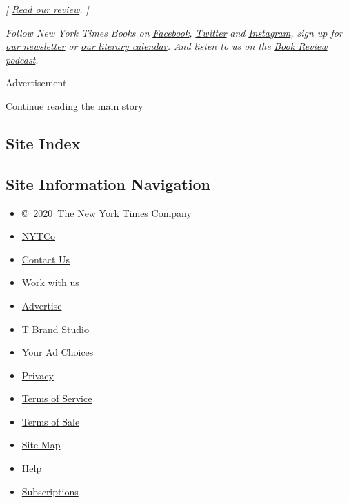 \emph{{[}}
\href{https://www.nytimes.com/2020/07/07/books/review/want-lynn-steger-strong.html}{\emph{Read
our review}}\emph{. {]}}

\emph{Follow New York Times Books on}
\href{https://www.facebook.com/nytbooks/}{\emph{Facebook}}\emph{,}
\href{https://twitter.com/nytimesbooks}{\emph{Twitter}} \emph{and}
\href{https://www.instagram.com/nytbooks/}{\emph{Instagram}}\emph{, sign
up for}
\href{https://www.nytimes.com/newsletters/books-review}{\emph{our
newsletter}} \emph{or}
\href{https://www.nytimes.com/interactive/2017/books/books-calendar.html}{\emph{our
literary calendar}}\emph{. And listen to us on the}
\href{https://www.nytimes.com/column/book-review-podcast}{\emph{Book
Review podcast}}\emph{.}

Advertisement

\protect\hyperlink{after-bottom}{Continue reading the main story}

\hypertarget{site-index}{%
\subsection{Site Index}\label{site-index}}

\hypertarget{site-information-navigation}{%
\subsection{Site Information
Navigation}\label{site-information-navigation}}

\begin{itemize}
\tightlist
\item
  \href{https://help.nytimes.com/hc/en-us/articles/115014792127-Copyright-notice}{©~2020~The
  New York Times Company}
\end{itemize}

\begin{itemize}
\tightlist
\item
  \href{https://www.nytco.com/}{NYTCo}
\item
  \href{https://help.nytimes.com/hc/en-us/articles/115015385887-Contact-Us}{Contact
  Us}
\item
  \href{https://www.nytco.com/careers/}{Work with us}
\item
  \href{https://nytmediakit.com/}{Advertise}
\item
  \href{http://www.tbrandstudio.com/}{T Brand Studio}
\item
  \href{https://www.nytimes.com/privacy/cookie-policy\#how-do-i-manage-trackers}{Your
  Ad Choices}
\item
  \href{https://www.nytimes.com/privacy}{Privacy}
\item
  \href{https://help.nytimes.com/hc/en-us/articles/115014893428-Terms-of-service}{Terms
  of Service}
\item
  \href{https://help.nytimes.com/hc/en-us/articles/115014893968-Terms-of-sale}{Terms
  of Sale}
\item
  \href{https://spiderbites.nytimes.com}{Site Map}
\item
  \href{https://help.nytimes.com/hc/en-us}{Help}
\item
  \href{https://www.nytimes.com/subscription?campaignId=37WXW}{Subscriptions}
\end{itemize}

